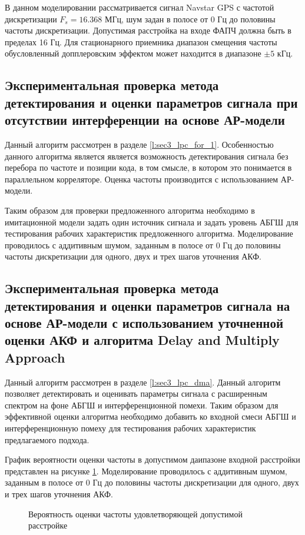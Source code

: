 В данном моделировании рассматривается сигнал Navstar GPS с частотой дискретизации ${F_s=16.368}$ МГц, шум задан в полосе от 0 Гц
до половины частоты дискретизации. Допустимая расстройка на входе ФАПЧ должна быть в пределах 16 Гц. 
Для стационарного приемника диапазон смещения частоты обусловленный допплеровским эффектом \cite{tsui} может находится в диапазоне ${\pm 5}$ кГц.

\subsection{Экспериментальная проверка метода детектирования и оценки параметров сигнала при отсутствии интерференции на основе АР-модели}

Данный алгоритм рассмотрен в разделе \ref{l:sec3_lpc_for_1}. Особенностью данного алгоритма является является возможность детектирования сигнала
без перебора по частоте и позиции кода, в том смысле, в котором это понимается в параллельном корреляторе. Оценка частоты производится с
использованием АР-модели.

Таким образом для проверки предложенного алгоритма необходимо в имитационной модели задать один источник сигнала и задать уровень АБГШ для
тестирования рабочих характеристик предложенного алгоритма. Моделирование проводилось с аддитивным шумом, заданным в полосе от 0 Гц до
половины частоты дискретизации для одного, двух и трех шагов уточнения АКФ.


\subsection{Экспериментальная проверка метода детектирования и оценки параметров сигнала на основе АР-модели с использованием уточненной оценки АКФ
	и алгоритма Delay and Multiply Approach}

Данный алгоритм рассмотрен в разделе \ref{l:sec3_lpc_dma}. Данный алгоритм позволяет детектировать и оценивать параметры сигнала с расширенным спектром
на фоне АБГШ и интерференционной помехи. Таким образом для эффективной оценки алгоритма необходимо добавить ко входной смеси АБГШ и интерференционную помеху
для тестирования рабочих характеристик предлагаемого подхода.

График вероятности оценки частоты в допустимом даипазоне входной расстройки представлен на рисунке
\ref{pic:ar_dma_probability}. Моделирование проводилось с аддитивным шумом, заданным в полосе от 0 Гц до
половины частоты дискретизации для одного, двух и трех шагов уточнения АКФ.

\begin{figure}[H]
\center{}
	\caption{Вероятность оценки частоты удовлетворяющей допустимой расстройке}
	\label{pic:ar_dma_probability}
\end{figure}
